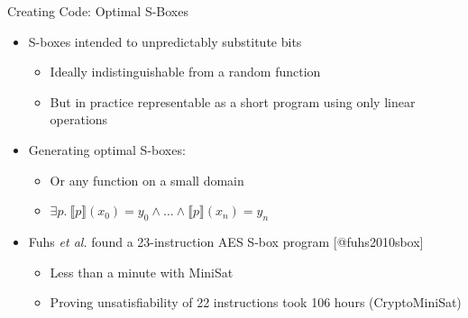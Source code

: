 \documentclass[ignorenonframetext,]{beamer}
\providecommand{\tightlist}{%
  \setlength{\itemsep}{0pt}\setlength{\parskip}{0pt}}
\begin{document}
\begin{frame}{Creating Code: Optimal S-Boxes}

\begin{itemize}
\tightlist
\item
  S-boxes intended to unpredictably substitute bits

  \begin{itemize}
  \tightlist
  \item
    Ideally indistinguishable from a random function
  \item
    But in practice representable as a short program using only linear
    operations
  \end{itemize}
\item
  Generating optimal S-boxes:

  \begin{itemize}
  \tightlist
  \item
    Or any function on a small domain
  \item
    \(\exists p.~\llbracket{}p\rrbracket{}(x_{0}) = y_{0} \wedge \dots \wedge  \llbracket{}p\rrbracket{}(x_{n}) = y_{n}\)
  \end{itemize}
\item
  Fuhs \emph{et al.} found a 23-instruction AES S-box program
  {[}@fuhs2010sbox{]}

  \begin{itemize}
  \tightlist
  \item
    Less than a minute with MiniSat
  \item
    Proving unsatisfiability of 22 instructions took 106 hours
    (CryptoMiniSat)
  \end{itemize}
\end{itemize}

\end{frame}
\end{document}
